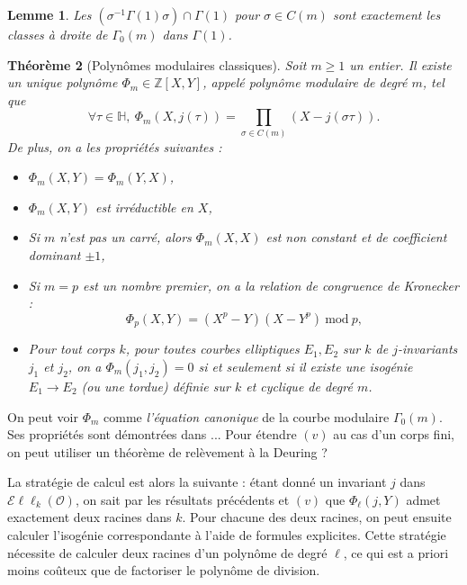 \documentclass[11pt,a4paper]{article}
\newcommand{\Z}{\mathbb{Z}}
\renewcommand{\H}{\mathbb{H}}
\renewcommand{\O}{\mathcal{O}}
\newcommand{\vers}{\rightarrow}
\newcommand{\Ell}{\mathcal{E}\ell\ell}
\newtheorem{thm}{Théorème}[subsection]
\newtheorem{lem}[thm]{Lemme}
\theoremstyle{definition}
\begin{document}
\begin{lem}
Les $(\sigma^{-1}\Gamma(1)\sigma)\cap \Gamma(1)$ pour $\sigma\in C(m)$ sont exactement les classes à droite de $\Gamma_0(m)$ dans $\Gamma(1)$.
\end{lem}

\begin{thm}[Polynômes modulaires classiques]

Soit $m\geq 1$ un entier. Il existe un unique  polynôme $\Phi_m \in \Z[X,Y]$, appelé \emph{polynôme modulaire} de degré $m$, tel que
$$\forall \tau\in\H,\ \Phi_m(X,j(\tau))=\prod_{\sigma\in C(m)} (X-j(\sigma\tau)).$$
De plus, on a les propriétés suivantes :

\begin{itemize}
\item[(i)] $\Phi_m(X,Y)=\Phi_m(Y,X)$,
\item[(ii)] $\Phi_m(X,Y)$ est irréductible en $X$,
\item[(iii)] Si $m$ n'est pas un carré, alors $\Phi_m(X,X)$ est non constant et de coefficient dominant $\pm 1$,
\item[(iv)] Si $m=p$ est un nombre premier, on a la \emph{relation de congruence de Kronecker} :
$$\Phi_p(X,Y) = (X^p-Y)(X-Y^p) \: \mathrm{mod}\ p,$$
\item[(v)] Pour tout corps $k$, pour toutes courbes elliptiques $E_1,E_2$ sur $k$ de $j$-invariants $j_1$ et $j_2$, on a $\Phi_m(j_1,j_2)=0$ si et seulement si il existe une isogénie $E_1 \vers E_2$ (ou une tordue) définie sur $k$ et cyclique de degré $m$.
\end{itemize}

\end{thm}

On peut voir $\Phi_m$ comme \emph{l'équation canonique} de la courbe modulaire $\Gamma_0(m)$. Ses propriétés sont démontrées dans ... Pour étendre $(v)$ au cas d'un corps fini, on peut utiliser un théorème de relèvement à la Deuring ?

\vspace{5mm}

La stratégie de calcul est alors la suivante : étant donné un invariant $j$ dans $\Ell_k(\O)$, on sait par les résultats précédents et $(v)$ que $\Phi_\ell(j,Y)$ admet exactement deux racines dans $k$. Pour chacune des deux racines, on peut ensuite calculer l'isogénie correspondante à l'aide de formules explicites. Cette stratégie nécessite de calculer deux racines d'un polynôme de degré $\ell$, ce qui est a priori moins coûteux que de factoriser le polynôme de division.
\end{document}
